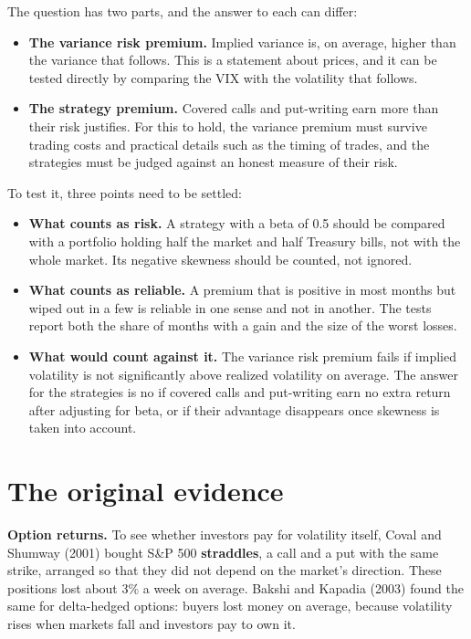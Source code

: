 The question has two parts, and the answer to each can differ:

\begin{itemize}
  \item \textbf{The variance risk premium.} Implied variance is, on average, higher than the variance that follows. This is a statement about prices, and it can be tested directly by comparing the VIX with the volatility that follows.
  \item \textbf{The strategy premium.} Covered calls and put-writing earn more than their risk justifies. For this to hold, the variance premium must survive trading costs and practical details such as the timing of trades, and the strategies must be judged against an honest measure of their risk.
\end{itemize}

To test it, three points need to be settled:

\begin{itemize}
  \item \textbf{What counts as risk.} A strategy with a beta of 0.5 should be compared with a portfolio holding half the market and half Treasury bills, not with the whole market. Its negative skewness should be counted, not ignored.
  \item \textbf{What counts as reliable.} A premium that is positive in most months but wiped out in a few is reliable in one sense and not in another. The tests report both the share of months with a gain and the size of the worst losses.
  \item \textbf{What would count against it.} The variance risk premium fails if implied volatility is not significantly above realized volatility on average. The answer for the strategies is no if covered calls and put-writing earn no extra return after adjusting for beta, or if their advantage disappears once skewness is taken into account.
\end{itemize}

\section{The original evidence}
\label{sec:16-evidence}

\textbf{Option returns.} To see whether investors pay for volatility itself, Coval and Shumway (2001) bought S\&P 500 \textbf{straddles}, a call and a put with the same strike, arranged so that they did not depend on the market's direction. These positions lost about 3\% a week on average. Bakshi and Kapadia (2003) found the same for delta-hedged options: buyers lost money on average, because volatility rises when markets fall and investors pay to own it.

